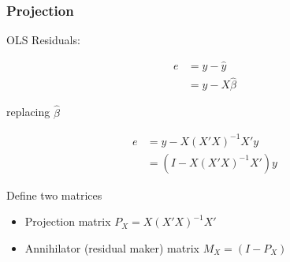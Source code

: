 \documentclass[
  shownotes,
  xcolor={svgnames},
  hyperref={colorlinks,citecolor=DarkBlue,linkcolor=DarkRed,urlcolor=DarkBlue}
  , aspectratio=169]{beamer}
\begin{document}
\begin{frame}
\frametitle{Projection}

OLS Residuals:

\begin{align}
e &=y-\hat y \\
 &=y-X\hat\beta 
\end{align}

replacing $\hat \beta $

\begin{align}
e &= y- X(X'X)^{-1}X'y \\
  &= (I- X(X'X)^{-1}X')y
\end{align}

Define two matrices

\begin{itemize}
\item Projection matrix $P_X=X(X'X)^{-1}X'$ 
\item Annihilator (residual maker) matrix $M_X=(I-P_X)$
\end{itemize}


\end{frame}
\end{document}
